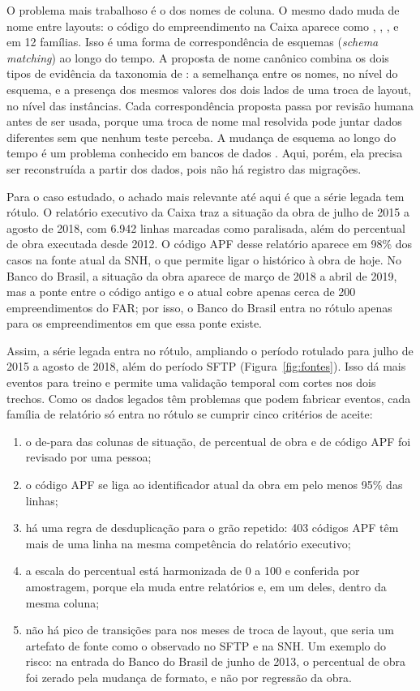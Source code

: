 O problema mais trabalhoso é o dos nomes de coluna. O mesmo dado muda de nome entre layouts: o código do empreendimento na Caixa aparece como , , ,  e  em 12 famílias. Isso é uma forma de correspondência de esquemas (\textit{schema matching}) ao longo do tempo. A proposta de nome canônico combina os dois tipos de evidência da taxonomia de : a semelhança entre os nomes, no nível do esquema, e a presença dos mesmos valores dos dois lados de uma troca de layout, no nível das instâncias. Cada correspondência proposta passa por revisão humana antes de ser usada, porque uma troca de nome mal resolvida pode juntar dados diferentes sem que nenhum teste perceba. A mudança de esquema ao longo do tempo é um problema conhecido em bancos de dados \cite{curino2008}. Aqui, porém, ela precisa ser reconstruída a partir dos dados, pois não há registro das migrações.

Para o caso estudado, o achado mais relevante até aqui é que a série legada tem rótulo. O relatório executivo da Caixa traz a situação da obra de julho de 2015 a agosto de 2018, com 6.942 linhas marcadas como paralisada, além do percentual de obra executada desde 2012. O código APF desse relatório aparece em 98\% dos casos na fonte atual da SNH, o que permite ligar o histórico à obra de hoje. No Banco do Brasil, a situação da obra aparece de março de 2018 a abril de 2019, mas a ponte entre o código antigo e o atual cobre apenas cerca de 200 empreendimentos do FAR; por isso, o Banco do Brasil entra no rótulo apenas para os empreendimentos em que essa ponte existe.

Assim, a série legada entra no rótulo, ampliando o período rotulado para julho de 2015 a agosto de 2018, além do período SFTP (Figura~\ref{fig:fontes}). Isso dá mais eventos para treino e permite uma validação temporal com cortes nos dois trechos. Como os dados legados têm problemas que podem fabricar eventos, cada família de relatório só entra no rótulo se cumprir cinco critérios de aceite:

\begin{enumerate}
	\item o de-para das colunas de situação, de percentual de obra e de código APF foi revisado por uma pessoa;
	\item o código APF se liga ao identificador atual da obra em pelo menos 95\% das linhas;
	\item há uma regra de desduplicação para o grão repetido: 403 códigos APF têm mais de uma linha na mesma competência do relatório executivo;
	\item a escala do percentual está harmonizada de 0 a 100 e conferida por amostragem, porque ela muda entre relatórios e, em um deles, dentro da mesma coluna;
	\item não há pico de transições para  nos meses de troca de layout, que seria um artefato de fonte como o observado no SFTP e na SNH. Um exemplo do risco: na entrada do Banco do Brasil de junho de 2013, o percentual de obra foi zerado pela mudança de formato, e não por regressão da obra.
\end{enumerate}

